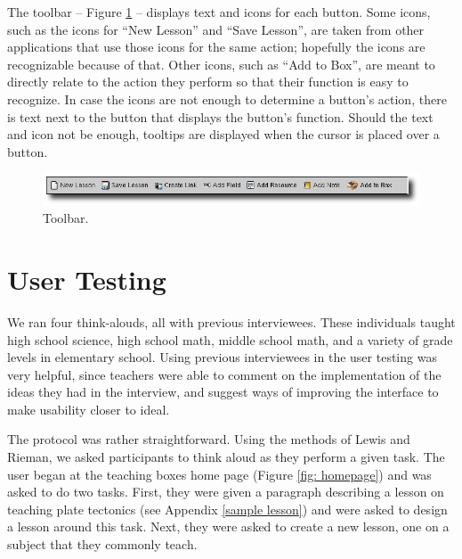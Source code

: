 \documentclass[10pt,letter]{article}
\begin{document}
The toolbar -- Figure \ref{fig: toolbar ss} -- displays text and icons for each
button. Some icons, such as the icons for ``New Lesson'' and ``Save Lesson'',
are taken from other applications that use those icons for the same action;
hopefully the icons are recognizable because of that. Other icons, such as ``Add
to Box'', are meant to directly relate to the action they perform so that their
function is easy to recognize. In case the icons are not enough to determine a
button's action, there is text next to the button that displays the button's
function. Should the text and icon not be enough, tooltips are displayed when
the cursor is placed over a button.

\begin{figure}[htb]
	\centering
	\includegraphics[width=0.9\linewidth]{figures/toolbar}
	\caption{Toolbar.}
	\label{fig: toolbar ss}
\end{figure}

\section{User Testing}
We ran four think-alouds, all with previous interviewees.  These individuals
taught high school science, high school math, middle school math, and a variety
of grade levels in elementary school.  Using previous interviewees in the user
testing was very helpful, since teachers were able to comment on the
implementation of the ideas they had in the interview, and suggest ways of
improving the interface to make usability closer to ideal.

The protocol was rather straightforward. Using the methods of Lewis and Rieman,
we asked participants to think aloud as they perform a given task. The user
began at the teaching boxes home page (Figure \ref{fig: homepage}) and was asked
to do two tasks.  First, they were given a paragraph describing a lesson on
teaching plate tectonics (see Appendix \ref{sample lesson}) and were asked to
design a lesson around this task.  Next, they were asked to create a new lesson,
one on a subject that they commonly teach.
\end{document}
